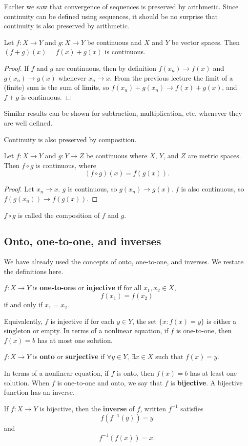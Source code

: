 Earlier we saw that convergence of sequences is preserved by
arithmetic. Since continuity can be defined using sequences, it should
be no surprise that continuity is also preserved by arithmetic.
\begin{theorem}
  Let $f:X \to Y$ and $g:X \to Y$ be continuous and $X$ and $Y$ be
  vector spaces. Then $(f+g)(x) = f(x) + g(x)$ is continuous.
\end{theorem}
\begin{proof}
  If $f$ and $g$ are continuous, then by definition $f(x_n) \to f(x)$
  and $g(x_n) \to g(x)$ whenever $x_n \to x$. From the previous
  lecture the limit of a (finite) sum is the sum of limits, so 
  $f(x_n) + g(x_n) \to f(x) + g(x)$, and $f+g$ is continuous.
\end{proof}
Similar results can be shown for subtraction, multiplication, etc,
whenever they are well defined. 

Continuity is also preserved by composition.
\begin{theorem}
  Let $f:X \to Y$ and $g:Y \to Z$ be continuous where $X$, $Y$, and
  $Z$ are metric spaces. Then $f \circ g$ is continuous, where
  \[ (f \circ g)(x) = f(g(x)). \]
\end{theorem}  
\begin{proof}
  Let $x_n \to x$. $g$ is continuous, so $g(x_n) \to g(x)$. $f$ is
  also continuous, so $f(g(x_n)) \to f(g(x))$.
\end{proof}
$f\circ g$ is called the composition of $f$ and $g$.

\subsection{Onto, one-to-one, and inverses}
We have already used the concepts of onto, one-to-one, and inverses.
We restate the definitions here.
\begin{definition}
  $f:X \to Y$ is \textbf{one-to-one} or \textbf{injective} if for all
  $x_1, x_2 \in X$, 
  \[ f(x_1) = f(x_2) \]
  if and only if $x_1 = x_2$.
\end{definition}
Equivalently, $f$ is injective if for each $y \in Y$, the set $\{x:
f(x) = y\}$ is either a singleton or empty.  In terms of a nonlinear
equation, if $f$ is one-to-one, then $f(x) = b$ has at most one
solution. 
\begin{definition}
  $f:X \to Y$ is \textbf{onto} or \textbf{surjective} if $\forall y
  \in Y$, $\exists x \in X$ such that $f(x) = y$.
\end{definition}
In terms of a nonlinear equation, if $f$ is onto, then $f(x) = b$ has
at least one solution. When $f$ is one-to-one and onto, we say that
$f$ is \textbf{bijective}. A bijective function has an inverse.
\begin{definition}
  If $f:X \to Y$ is bijective, then the \textbf{inverse} of $f$,
  written $f^{-1}$ satisfies
  \[ f(f^{-1} (y)) = y  \]
  and 
  \[ f^{-1} ( f(x) ) = x. \]
\end{definition}


